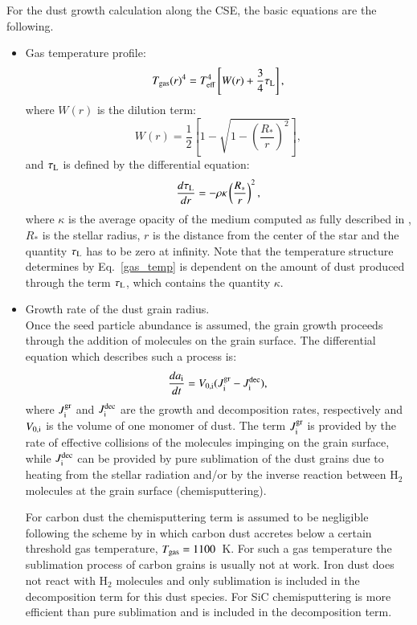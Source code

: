 \documentclass[useAMS,usenatbib]{mn2e/mn2e}
\begin{document}
For the dust growth calculation along the CSE, the basic equations are the following.
\begin{itemize}
\item Gas temperature profile:
\begin{equation}\label{gas_temp}
T_{\rm gas}(r)^4=T_{\rm eff}^4\left[W(r)+\frac{3}{4}\tau_{\rm L}\right],
\end{equation}
%
where $W(r)$ is the dilution term:
\begin{equation}
W(r)=\frac{1}{2}\left[1-\sqrt{1-\left(\frac{R_*}{r}\right)^2}\right],
\end{equation}
and $\tau_{\rm L}$ is defined by the differential equation:
\begin{equation}\label{tauL}
\frac{d\tau_{\rm L}}{dr}=-\rho\kappa \left(\frac{R_*}{r}\right)^2,
\end{equation}
%
where $\kappa$ is the average opacity of the medium computed as fully described in \citet{Nanni13, Nanni14}, $R_*$ is the stellar radius, $r$ is the distance from the center of the star and the quantity $\tau_{\rm L}$ has to be zero at infinity. 
Note that the temperature structure determines by Eq.~\ref{gas_temp} is dependent on the amount of dust produced through the term $\tau_{\rm L}$, which contains the quantity $\kappa$.

\item Growth rate of the dust grain radius.\\
Once the seed particle abundance is assumed, the grain growth proceeds through the addition of molecules on the grain surface. The differential equation which describes such a process is:
\begin{equation}\label{dadt}
 \frac{da_{\rm i}}{dt}=V_{\rm 0,i} (J^{\rm gr}_{\rm i}-J^{\rm dec}_{\rm i}),
\end{equation}
%
where $J^{\rm gr}_{\rm i}$ and $J^{\rm dec}_{\rm i}$ are the growth and decomposition rates, respectively and $V_{\rm 0, i}$ is the volume of one monomer of dust. The term $J^{\rm gr}_{\rm i}$ is provided by the rate of effective collisions of the molecules impinging on the grain surface, while $J^{\rm dec}_{\rm i}$ can be provided by pure sublimation of the dust grains due to heating from the stellar radiation and/or by the inverse reaction between H$_2$ molecules at the grain surface (chemisputtering).

For carbon dust the chemisputtering term is assumed to be negligible following the scheme by \citet{Cherchneff92} in which carbon dust accretes below a certain threshold gas temperature, $T_{\rm gas}=1100$~K.  For such a gas temperature the sublimation process of carbon grains is usually not at work.  Iron dust does not react with H$_2$ molecules and only sublimation is included in the decomposition term for this dust species. For SiC chemisputtering is more efficient than pure sublimation and is included in the decomposition term.


\end{itemize}
\end{document}

